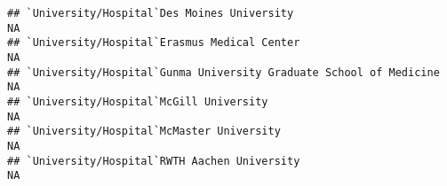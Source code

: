 \documentclass[]{article}
\begin{document}
\begin{verbatim}
## `University/Hospital`Des Moines University                                                                                                                                                                                                                                                                                                                                                                                                                                              NA
## `University/Hospital`Erasmus Medical Center                                                                                                                                                                                                                                                                                                                                                                                                                                             NA
## `University/Hospital`Gunma University Graduate School of Medicine                                                                                                                                                                                                                                                                                                                                                                                                                       NA
## `University/Hospital`McGill University                                                                                                                                                                                                                                                                                                                                                                                                                                                  NA
## `University/Hospital`McMaster University                                                                                                                                                                                                                                                                                                                                                                                                                                                NA
## `University/Hospital`RWTH Aachen University                                                                                                                                                                                                                                                                                                                                                                                                                                             NA

\end{verbatim}
\end{document}
